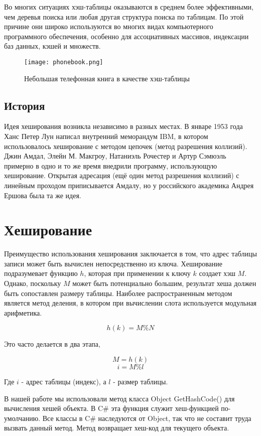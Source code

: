 Во многих ситуациях хэш-таблицы оказываются в среднем более эффективными, чем деревья поиска или любая другая структура поиска по таблицам. 
По этой причине они широко используются во многих видах компьютерного программного обеспечения, особенно для ассоциативных массивов, индексации баз данных, кэшей и множеств.

\begin{figure}[H]
	\begin{center}
		\texttt{[image: phonebook.png]}
		\caption{Небольшая телефонная книга в качестве хэш-таблицы}
	\end{center}
\end{figure}

\subsection{История}

Идея хеширования возникла независимо в разных местах.
В январе 1953 года Ханс Петер Лун написал внутренний меморандум IBM, в котором использовалось хеширование с методом цепочек (метод разрешения коллизий).
Джин Амдал, Элейн М. Макгроу, Натаниэль Рочестер и Артур Сэмюэль примерно в одно и то же время внедрили программу, использующую хеширование.
Открытая адресация (ещё один метод разрешения коллизий) с линейным проходом приписывается Амдалу, но у российского академика Андрея Ершова была та же идея.\cite{HansPeterLuhn}

\section{Хеширование}

Преимущество использования хеширования заключается в том, что адрес таблицы записи может быть вычислен непосредственно из ключа.
Хеширование подразумевает функцию $h$, которая при применении к ключу $k$ создает хэш $M$. 
Однако, поскольку $M$ может быть потенциально большим, результат хеша должен быть сопоставлен размеру таблицы.
Наиболее распространенным методом является метод деления, в котором при вычислении слота используется модульная арифметика.

\[h(k)=M \% N\]

Это часто делается в два этапа,

\[M = h(k)\]
\[i = M \% l\]

Где $i$ - адрес таблицы (индекс), а $l$ - размер таблицы.

В нашей работе мы использовали метод класса Object GetHashCode() для вычисления хешей объекта.
В C\# эта функция служит хеш-функцией по-умолчанию.
Все классы в C\# наследуются от Object, так что не составит труда вызвать данный метод.
Метод возвращает хеш-код для текущего объекта.

